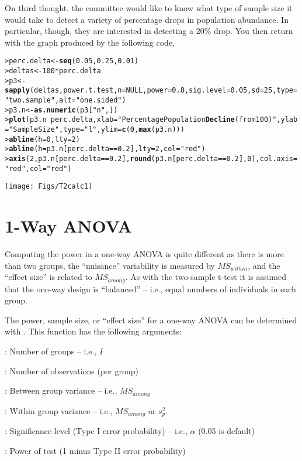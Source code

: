 \documentclass{article}\usepackage{graphicx, color}
\makeatletter
\newcommand{\hlfunctioncall}[1]{\textcolor[rgb]{0.501960784313725,0,0.329411764705882}{\textbf{#1}}}%
\newcommand{\hlstring}[1]{\textcolor[rgb]{0.6,0.6,1}{#1}}%
\newenvironment{kframe}{%
 \def\at@end@of@kframe{}%
 \ifinner\ifhmode%
  \def\at@end@of@kframe{\end{minipage}}%
  \begin{minipage}{\columnwidth}%
 \fi\fi%
 \def\FrameCommand##1{\hskip\@totalleftmargin \hskip-\fboxsep
 \colorbox{shadecolor}{##1}\hskip-\fboxsep
     \hskip-\linewidth \hskip-\@totalleftmargin \hskip\columnwidth}%
 \MakeFramed {\advance\hsize-\width
   \@totalleftmargin\z@ \linewidth\hsize
   \@setminipage}}%
 {\par\unskip\endMakeFramed%
 \at@end@of@kframe}
\newenvironment{knitrout}{}{} %
\makeatother
\begin{document}
On third thought, the committee would like to know what type of sample size it would take to detect a variety of percentage drops in population abundance.  In particular, though, they are interested in detecting a 20\% drop.  You then return with the graph produced by the following code,
\begin{knitrout}
\color{fgcolor}\begin{kframe}
\begin{alltt}
> perc.delta <- \hlfunctioncall{seq}(0.05,0.25,0.01)
> deltas <- 100*perc.delta
> p3 <- \hlfunctioncall{sapply}(deltas,power.t.test,n=NULL,power=0.8,sig.level=0.05,sd=25,type=\hlstring{"two.sample"},alt=\hlstring{"one.sided"})
> p3.n <- \hlfunctioncall{as.numeric}(p3[\hlstring{"n"},])
> \hlfunctioncall{plot}(p3.n~perc.delta,xlab=\hlstring{"Percentage Population \hlfunctioncall{Decline} (from 100)"},ylab=\hlstring{"Sample Size"},type=\hlstring{"l"},ylim=\hlfunctioncall{c}(0,\hlfunctioncall{max}(p3.n)))
> \hlfunctioncall{abline}(h=0,lty=2)
> \hlfunctioncall{abline}(h=p3.n[perc.delta==0.2],lty=2,col=\hlstring{"red"})
> \hlfunctioncall{axis}(2,p3.n[perc.delta==0.2],\hlfunctioncall{round}(p3.n[perc.delta==0.2],0),col.axis=\hlstring{"red"},col=\hlstring{"red"})
\end{alltt}
\end{kframe}

{\centering \texttt{[image: Figs/T2calc1]} 

}



\end{knitrout}



\section{1-Way ANOVA}
Computing the power in a one-way ANOVA is quite different as there is more than two groups, the ``nuisance'' variability is measured by $MS_{within}$, and the ``effect size'' is related to $MS_{among}$.  As with the two-sample t-test it is assumed that the one-way design is ``balanced'' -- i.e., equal numbers of individuals in each group.

The power, sample size, or ``effect size'' for a one-way ANOVA can be determined with .  This function has the following arguments:

\begin{Itemize}
  \item {}: Number of groups -- i.e., $I$
  \item {}: Number of observations (per group)
  \item {}: Between group variance -- i.e., $MS_{among}$
  \item {}: Within group variance -- i.e., $MS_{among}$ or $s_{p}^{2}$.
  \item {}: Significance level (Type I error probability) -- i.e., $\alpha$ (0.05 is default)
  \item {}: Power of test (1 minus Type II error probability) 
\end{Itemize}
\end{document}
